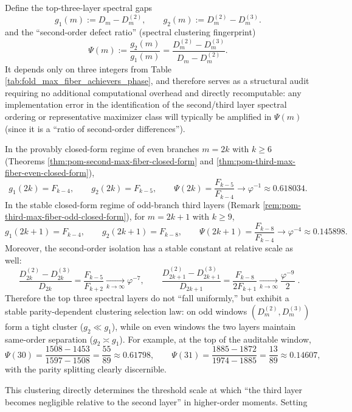 \begin{remark}\label{rem:pom-spectrum-gap-ratio-fingerprint}
Define the top-three-layer spectral gaps
\[
g_{1}(m):=D_m-D_m^{(2)},
\qquad
g_{2}(m):=D_m^{(2)}-D_m^{(3)}.
\]
and the ``second-order defect ratio'' (spectral clustering fingerprint)
\[
\Psi(m):=\frac{g_2(m)}{g_1(m)}
=\frac{D_m^{(2)}-D_m^{(3)}}{D_m-D_m^{(2)}}.
\]
It depends only on three integers from Table \ref{tab:fold_max_fiber_achievers_phase}, and therefore serves as a structural audit requiring no additional computational overhead and directly recomputable: any implementation error in the identification of the second/third layer spectral ordering or representative maximizer class will typically be amplified in \(\Psi(m)\) (since it is a ``ratio of second-order differences'').
\par
In the provably closed-form regime of even branches \(m=2k\) with \(k\ge 6\) (Theorems \ref{thm:pom-second-max-fiber-closed-form} and \ref{thm:pom-third-max-fiber-even-closed-form}),
\[
g_1(2k)=F_{k-4},\qquad g_2(2k)=F_{k-5},
\qquad
\Psi(2k)=\frac{F_{k-5}}{F_{k-4}}
\longrightarrow \varphi^{-1}\approx 0.618034.
\]
In the stable closed-form regime of odd-branch third layers (Remark \ref{rem:pom-third-max-fiber-odd-closed-form}), for \(m=2k+1\) with \(k\ge 9\),
\[
g_1(2k+1)=F_{k-4},\qquad g_2(2k+1)=F_{k-8},
\qquad
\Psi(2k+1)=\frac{F_{k-8}}{F_{k-4}}
\longrightarrow \varphi^{-4}\approx 0.145898.
\]
Moreover, the second-order isolation has a stable constant at relative scale as well:
\[
\boxed{\;
\frac{D_{2k}^{(2)}-D_{2k}^{(3)}}{D_{2k}}
=\frac{F_{k-5}}{F_{k+2}}
\xrightarrow[k\to\infty]{}\varphi^{-7},\qquad
\frac{D_{2k+1}^{(2)}-D_{2k+1}^{(3)}}{D_{2k+1}}
=\frac{F_{k-8}}{2F_{k+1}}
\xrightarrow[k\to\infty]{}\frac{\varphi^{-9}}{2}\; }.
\]
Therefore the top three spectral layers do not ``fall uniformly,'' but exhibit a stable parity-dependent clustering selection law: on odd windows \((D_m^{(2)},D_m^{(3)})\) form a tight cluster (\(g_2\ll g_1\)), while on even windows the two layers maintain same-order separation (\(g_2\asymp g_1\)).
For example, at the top of the auditable window,
\[
\Psi(30)=\frac{1508-1453}{1597-1508}=\frac{55}{89}\approx 0.61798,\qquad
\Psi(31)=\frac{1885-1872}{1974-1885}=\frac{13}{89}\approx 0.14607,
\]
with the parity splitting clearly discernible.
\par
This clustering directly determines the threshold scale at which ``the third layer becomes negligible relative to the second layer'' in higher-order moments. Setting

\end{remark}
